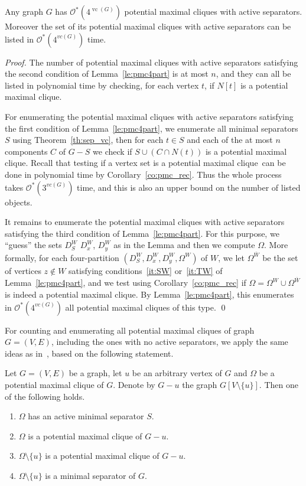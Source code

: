 \documentclass{llncs}
\newcommand{\cO}{\mathcal{O}}
\newcommand{\vc}{\operatorname{vc}}
\newcommand{\sm}{\setminus}
\newcommand{\pmc}{potential maximal clique}
\newcommand{\npmc}{4}
\begin{document}
\begin{theorem}\label{th:pmca_vc}
Any graph $G$ has $\cO^*(\npmc^{\vc(G)})$ \pmc s with active separators. Moreover the set of its \pmc s with active separators can be listed in $\cO^*(\npmc^{vc(G)})$ time.
\end{theorem}
\begin{proof}
The number of \pmc s with active separators satisfying the second condition of Lemma~\ref{le:pmc4part} is at most $n$, and they can all be listed in polynomial time by checking, for each vertex $t$, if $N[t]$ is a \pmc.

For enumerating the \pmc s with active separators satisfying the first condition of Lemma~\ref{le:pmc4part}, we enumerate all minimal separators $S$ using Theorem~\ref{th:sep_vc}, then 
for each $t \in S$ and each of the at most $n$ components $C$ of $G - S$ we check if $S \cup (C \cap N(t))$ is a \pmc. Recall that testing if a vertex set is a \pmc\ can be done in polynomial 
time by Corollary~\ref{co:pmc_rec}. Thus the whole process takes $\cO^*(3^{vc(G)})$ time, and this is also an upper bound on the number of listed objects.

It remains to enumerate the \pmc s with active separators satisfying the third condition of Lemma~\ref{le:pmc4part}. For this purpose, we ``guess'' the sets $D_S^W$ $D_x^W$, $D_y^W$ as in the Lemma and then we compute $\Omega$. More formally, for each four-partition $(D_S^W, D_x^W, D_y^W, \Omega^W)$ of $W$, we let $\Omega^{\overline{W}}$ be the set of vertices $z \not\in W$ satisfying conditions~\ref{it:SW} or~\ref{it:TW} of Lemma~\ref{le:pmc4part}, and we test using Corollary~\ref{co:pmc_rec} if $\Omega  = \Omega^W \cup \Omega^{\overline{W}}$ is indeed a \pmc. By Lemma~\ref{le:pmc4part}, this enumerates in $\cO^*(\npmc^{vc(G)})$ all \pmc s of this type. 
\qed
\end{proof}


For counting and enumerating all \pmc s of graph $G=(V,E)$, including the ones with no active separators, we apply the same ideas as in~\cite{BoTo02}, based on the following statement.


\begin{proposition}\label{pr:pmc_a}
Let $G=(V,E)$ be a graph, let $u$ be an arbitrary vertex of $G$ and $\Omega$ be a potential maximal clique of $G$. Denote by $G - u$ the graph $G[V \sm\{u\}]$. Then one of the following holds.
\begin{enumerate}
\item\label{it:active} $\Omega$ has an active minimal separator $S$.
\item\label{it:witha} $\Omega$ is a potential maximal clique of $G - u$.
\item\label{it:minusa} $\Omega \setminus \{u\}$ is a potential maximal clique of $G - u$.
\item\label{it:minsep} $\Omega \setminus \{u\}$ is a minimal separator of $G$.
\end{enumerate}
\end{proposition}
\end{document}
